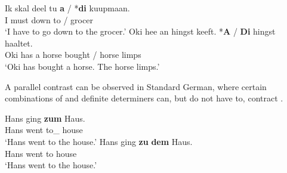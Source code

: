 \documentclass[output=paper
,modfonts
,nonflat]{langscibook}
\begin{document}
\begin{exe}
\ex\label{ex:schwarz:3}
\begin{xlist}
  \ex \gll Ik skal deel tu \textbf{a} \textnormal{/} \textnormal{*}\textbf{di} kuupmaan.\\
           I  must down to {\theweak} / {\phantom{*}}{\thestrong} grocer\\
      \glt `I have to go down to the grocer.'
  \ex \gll Oki hee an hingst keeft. \textnormal{*}\textbf{A} \textnormal{/} \textbf{Di} hingst haaltet.\\
           Oki has a horse bought {\phantom{*}}{\theweak} / {\thestrong} horse limps\\
      \glt `Oki has bought a horse. The horse limps.' 
\end{xlist}
\end{exe}


A parallel contrast can be observed in Standard German, where certain
combinations of  and definite determiners can, but do not
have to, contract \citep[see, among others,][]{Hartmann1978,Haberland1985,Cieschinger2006}.


\begin{exe}
\ex\label{ex:schwarz:4}
\begin{xlist}
\ex \gll Hans ging \textbf{zum} Haus.\\
        Hans went {to\_\theweak} house\\
    \glt `Hans went to the house.'
\ex \gll Hans ging \textbf{zu} \textbf{dem} Haus.\\
        Hans went to {\thestrong} house\\
    \glt `Hans went to the house.' 
\end{xlist}
\end{exe}
\end{document}
